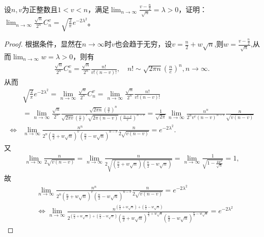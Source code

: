 \documentclass[../../main.tex]{subfiles}%
\begin{document}
\begin{example}
设\(n,v\)为正整数且\(1 < v < n\)，满足\(\lim_{n\rightarrow\infty}\frac{v-\frac{n}{2}}{\sqrt{n}}=\lambda>0\)，证明：\(\lim_{n\rightarrow\infty}\frac{\sqrt{n}}{2^n}C_n^v=\sqrt{\frac{2}{\pi}}e^{-2\lambda^2}\)。
\end{example}
\begin{proof}

根据条件，显然在\(n\rightarrow\infty\)时\(v\)也会趋于无穷，设\(v = \frac{n}{2}+w\sqrt{n}\),则$w=\frac{v-\frac{n}{2}}{\sqrt{n}}$,从而\(\lim_{n\rightarrow\infty}w=\lambda>0\)，则有
\begin{align*}
\frac{\sqrt{n}}{2^n}C_n^v=\frac{\sqrt{n}}{2^n}\frac{n!}{v!(n - v)!},\quad n!\sim\sqrt{2\pi n}\left(\frac{n}{e}\right)^n,n\to \infty.
\end{align*}
从而
\begin{align*}
&\sqrt{\frac{2}{\pi}}e^{-2\lambda ^2}=\lim_{n\rightarrow \infty} \frac{\sqrt{n}}{2^n}C_{n}^{v}=\underset{n\rightarrow \infty}{\lim}\frac{\sqrt{n}}{2^n}\frac{n!}{v!\left( n-v \right) !}
\\
&=\lim_{n\rightarrow \infty} \frac{\sqrt{n}}{2^n}\frac{\sqrt{2\pi n}\left( \frac{n}{e} \right) ^n}{\sqrt{2\pi v}\left( \frac{v}{e} \right) ^v\sqrt{2\pi (n-v)}\left( \frac{n-v}{e} \right) ^{n-v}}
=\frac{1}{\sqrt{2\pi}}\lim_{n\rightarrow \infty} \frac{n^n}{2^nv^v(n-v)^{n-v}}\frac{n}{\sqrt{v(n-v)}}
\\
\iff &\lim_{n\rightarrow \infty} \frac{n^n}{2^n\left( \frac{n}{2}+w\sqrt{n} \right) ^v\left( \frac{n}{2}-w\sqrt{n} \right) ^{n-v}}\frac{n}{2\sqrt{v(n-v)}}=e^{-2\lambda ^2}.
\end{align*}
又
\begin{align*}
\lim_{n\rightarrow \infty} \frac{n}{2\sqrt{v(n-v)}}=\lim_{n\rightarrow \infty} \frac{n}{2\sqrt{\left( \frac{n}{2}+w\sqrt{n} \right) \left( \frac{n}{2}-w\sqrt{n} \right)}}=\lim_{n\rightarrow \infty} \frac{1}{\sqrt{1-\frac{4w^2}{\sqrt{n}}}}=1,
\end{align*}
故
\begin{align}
&\lim_{n\rightarrow \infty} \frac{n^n}{2^n\left( \frac{n}{2}+w\sqrt{n} \right) ^v\left( \frac{n}{2}-w\sqrt{n} \right) ^{n-v}}\frac{n}{2\sqrt{v(n-v)}}=e^{-2\lambda ^2}
\nonumber
\\
&\iff \lim_{n\rightarrow \infty} \frac{n^{\left( \frac{n}{2}+w\sqrt{n} \right) +\left( \frac{n}{2}-w\sqrt{n} \right)}}{2^{\left( \frac{n}{2}+w\sqrt{n} \right) +\left( \frac{n}{2}-w\sqrt{n} \right)}\left( \frac{n}{2}+w\sqrt{n} \right) ^{\frac{n}{2}+w\sqrt{n}}\left( \frac{n}{2}-w\sqrt{n} \right) ^{\frac{n}{2}-w\sqrt{n}}}=e^{-2\lambda ^2}

\end{align}
\end{proof}
\end{document}
